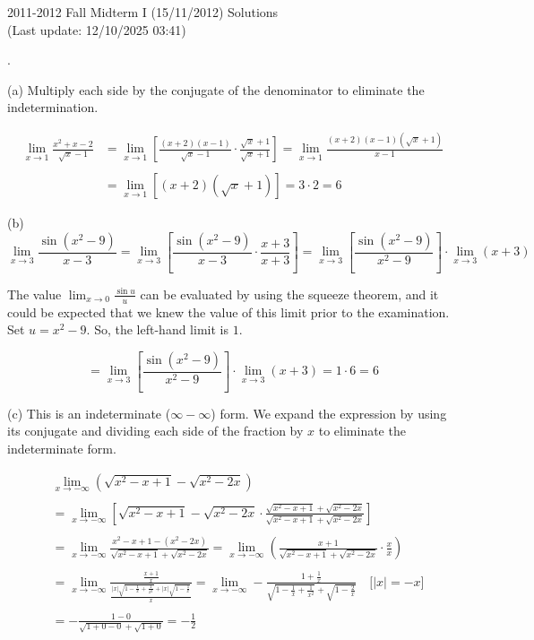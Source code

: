 \documentclass{article}
\begin{document}
\newpage

\begin{center}
2011-2012 Fall Midterm I (15/11/2012) Solutions\\
(Last update: 12/10/2025 03:41)
\end{center}

.

\hfill

\noindent (a) Multiply each side by the conjugate of the denominator to eliminate the indetermination.

\begin{align*}
\lim_{x\to1}\frac{x^2+x-2}{\sqrt x -1}&=\lim_{x\to1}\left[\frac{(x+2)(x-1)}{\sqrt x -1}\cdot \frac{\sqrt x + 1}{\sqrt x +1}\right]=\lim_{x\to1}\frac{(x+2)(x-1)\left(\sqrt x + 1\right)}{x-1}\\\\&=\lim_{x\to1}\left[(x+2)\left(\sqrt x + 1\right)\right] =3\cdot 2 = \boxed6
\end{align*}

\hfill

\noindent (b)
\[\lim_{x\to 3}\frac{\sin(x^2-9)}{x-3}=\lim_{x\to 3}\left[\frac{\sin(x^2-9)}{x-3}\cdot\frac{x+3}{x+3}\right]=\lim_{x\to3}\left[\frac{\sin(x^2-9)}{x^2-9}\right]\cdot\lim_{x\to 3}(x+3)\]

\hfill

\noindent The value $\displaystyle \lim_{x\to0}\frac{\sin u}{u}$ can be evaluated by using the squeeze theorem, and it could be expected that we knew the value of this limit prior to the examination. Set $u=x^2-9$. So, the left-hand limit is $1$.

\[=\lim_{x\to3}\left[\frac{\sin(x^2-9)}{x^2-9}\right]\cdot\lim_{x\to 3}(x+3) = 1\cdot 6 = \boxed6\]

\hfill

\noindent (c) This is an indeterminate ($\infty - \infty$) form. We expand the expression by using its conjugate and dividing each side of the fraction by $x$ to eliminate the indeterminate form.

\begin{align*}&\lim_{x\to -\infty}\left(\sqrt{x^2-x+1}-\sqrt{x^2-2x}\right)\\\\&=\lim_{x\to -\infty}\left[\sqrt{x^2-x+1}-\sqrt{x^2-2x}\cdot\frac{\sqrt{x^2-x+1}+\sqrt{x^2-2x}}{\sqrt{x^2-x+1}+\sqrt{x^2-2x}}\right]\\\\&=\lim_{x\to-\infty}\frac{x^2-x+1-\left(x^2-2x\right)}{\sqrt{x^2-x+1}+\sqrt{x^2-2x}}=\lim_{x\to-\infty}\left(\frac{x+1}{\sqrt{x^2-x+1}+\sqrt{x^2-2x}}\cdot\frac{x}{x}\right)\\\\&=\lim_{x\to-\infty}\frac{\displaystyle\frac{x+1}x}{\displaystyle\frac{|x|\sqrt{1-\frac1x+\frac1{x^2}}+|x|\sqrt{1-\frac1x}}x}=\lim_{x\to-\infty}-\frac{\displaystyle1+\frac{1}x}{\displaystyle\sqrt{1-\frac1x+\frac1{x^2}}+\sqrt{1-\frac2x}}\quad\Big[|x|=-x\Big]\\\\&=-\frac{1-0}{\sqrt{1+0-0}+\sqrt{1+0}}=\boxed{-\frac12}\end{align*}
\end{document}
